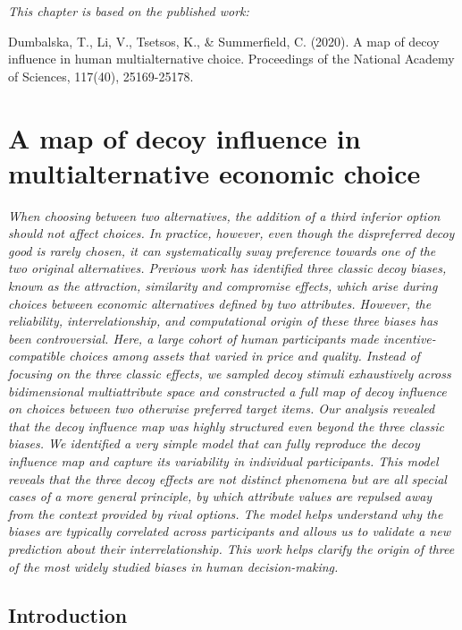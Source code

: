 \documentclass[a4paper, nobind]{templates/ociamthesis}
\begin{document}
\begin{savequote}
\emph{This chapter is based on the published work:}

Dumbalska, T., Li, V., Tsetsos, K., \& Summerfield, C. (2020). A map of
decoy influence in human multialternative choice. Proceedings of the
National Academy of Sciences, 117(40), 25169-25178.
\qauthor{}\end{savequote}

\hypertarget{decoy}{%
\chapter{A map of decoy influence in multialternative economic choice}\label{decoy}}

\minitoc

\noindent 
\emph{When choosing between two alternatives, the addition of a third inferior option should not affect choices. In practice, however, even though the dispreferred decoy good is rarely chosen, it can systematically sway preference towards one of the two original alternatives. Previous work has identified three classic decoy biases, known as the attraction, similarity and compromise effects, which arise during choices between economic alternatives defined by two attributes. However, the reliability, interrelationship, and computational origin of these three biases has been controversial. Here, a large cohort of human participants made incentive-compatible choices among assets that varied in price and quality. Instead of focusing on the three classic effects, we sampled decoy stimuli exhaustively across bidimensional multiattribute space and constructed a full map of decoy influence on choices between two otherwise preferred target items. Our analysis revealed that the decoy influence map was highly structured even beyond the three classic biases. We identified a very simple model that can fully reproduce the decoy influence map and capture its variability in individual participants. This model reveals that the three decoy effects are not distinct phenomena but are all special cases of a more general principle, by which attribute values are repulsed away from the context provided by rival options. The model helps understand why the biases are typically correlated across participants and allows us to validate a new prediction about their interrelationship. This work helps clarify the origin of three of the most widely studied biases in human decision-making.}

\hypertarget{introduction-1}{%
\section{Introduction}\label{introduction-1}}
\end{document}
